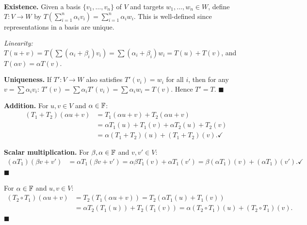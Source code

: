 \begin{proofbox}
\textbf{Existence.} Given a basis $\{v_1,\ldots,v_n\}$ of $V$ and
targets $w_1,\ldots,w_n\in W$, define $T:V\to W$ by
$T(\sum_{i=1}^n\alpha_i v_i)=\sum_{i=1}^n\alpha_i w_i$.  This is well-defined
since representations in a basis are unique.

\emph{Linearity:}
$T(u+v)=T(\sum(\alpha_i+\beta_i)v_i)=\sum(\alpha_i+\beta_i)w_i=T(u)+T(v)$, and
$T(\alpha v)=\alpha T(v)$.

\textbf{Uniqueness.} If $T':V\to W$ also satisfies $T'(v_i)=w_i$ for
all $i$, then for any $v=\sum\alpha_i v_i$:
$T'(v)=\sum\alpha_i T'(v_i)=\sum\alpha_i w_i=T(v)$.
Hence $T'=T$. \hfill$\blacksquare$
\end{proofbox}

\begin{proofbox}
\textbf{Addition.} For $u,v\in V$ and $\alpha\in\mathbb{F}$:
\begin{align*}
    (T_1+T_2)(\alpha u+v)
    &= T_1(\alpha u+v)+T_2(\alpha u+v)\\
    &= \alpha T_1(u)+T_1(v)+\alpha T_2(u)+T_2(v)\\
    &= \alpha(T_1+T_2)(u)+(T_1+T_2)(v). \checkmark
\end{align*}

\textbf{Scalar multiplication.} For $\beta,\alpha\in\mathbb{F}$ and $v,v'\in V$:
\begin{align*}
    (\alpha T_1)(\beta v+v')
    &= \alpha T_1(\beta v+v')
     = \alpha\beta T_1(v)+\alpha T_1(v')
     = \beta(\alpha T_1)(v)+(\alpha T_1)(v'). \checkmark
\end{align*}
\hfill$\blacksquare$
\end{proofbox}

\begin{proofbox}
For $\alpha\in\mathbb{F}$ and $u,v\in V$:
\begin{align*}
    (T_2\circ T_1)(\alpha u+v)
    &= T_2(T_1(\alpha u+v))
     = T_2(\alpha T_1(u)+T_1(v))\\
    &= \alpha T_2(T_1(u))+T_2(T_1(v))
     = \alpha(T_2\circ T_1)(u)+(T_2\circ T_1)(v).
\end{align*}
\hfill$\blacksquare$
\end{proofbox}

